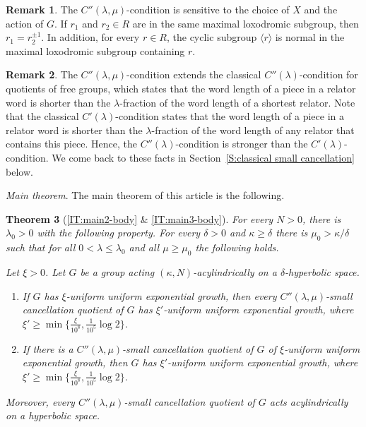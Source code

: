 \documentclass[leqno,a4paper,10pt]{amsart}
\theoremstyle{plain}
\newtheorem{thm}{Theorem}[section]
\theoremstyle{definition}
\newtheorem{rem}[thm]{Remark}
\theoremstyle{remark}
\let\ge\geqslant
\begin{document}
\begin{rem}\label{IR:smallcancellation}
The $C''(\lambda,\mu)$-condition is sensitive to the choice of $X$ and the action of $G$. %
If $r_1$ and $r_2 \in R$ are in the same maximal loxodromic subgroup, then $ r_1= r_2^{\pm 1}$. In addition, for every $r\in R$, the cyclic subgroup $\langle r \rangle$  is normal in the maximal loxodromic subgroup containing $r$. 
\end{rem}

\begin{rem} The $C''(\lambda,\mu)$-condition extends the classical $C''(\lambda)$-condition for quotients of free groups, which states that the word length of a piece in a relator word is shorter than the $\lambda$-fraction of the word length of a shortest relator.  Note that the classical $C'(\lambda)$-condition states that the word length of a piece in a relator word is shorter than the $\lambda$-fraction of the word length of any relator that contains this piece. Hence, the $C''(\lambda)$-condition is stronger than the $C'(\lambda)$-condition. We come back to these facts in Section~\ref{S:classical small cancellation} below.
\end{rem}

\textit{Main theorem}. 
The main theorem of this article is the following.
\begin{thm}[\autoref{IT:main2-body} \& \autoref{IT:main3-body}]
	\label{IT:main}
	For every $N >0$, there is $\lambda_0>0$ with the following property. For every $\delta>0$ and $\kappa\ge \delta$ there is $\mu_0> \kappa/\delta $ such that for all $0<\lambda\leqslant \lambda_0$ and all $\mu\geqslant \mu_0$ the following holds. 
	
	Let $\xi>0$. Let $G$ be a group acting $(\kappa,N)$-acylindrically on a $\delta$-hyperbolic space. 
	\begin{enumerate}[label=(\roman*)]
		\item If $G$ has $\xi$-uniform uniform exponential growth, then every $C''(\lambda,\mu)$-small cancellation quotient of $G$ has $\xi'$-uniform uniform exponential growth, where $\xi'\geqslant \min\{\frac{\xi}{10^8},\frac{1}{10^5}\log 2\}$.
		\item If there is a $C''(\lambda,\mu)$-small cancellation quotient of $G$ of $\xi$-uniform uniform exponential growth, then $G$ has $\xi'$-uniform uniform exponential growth, where  $\xi'\geqslant \min\{\frac{\xi}{10^8},\frac{1}{10^5}\log 2\}$.
	\end{enumerate}
Moreover, every $C''(\lambda,\mu)$-small cancellation quotient of $G$ acts acylindrically  on a hyperbolic space. %
\end{thm}
\end{document}
